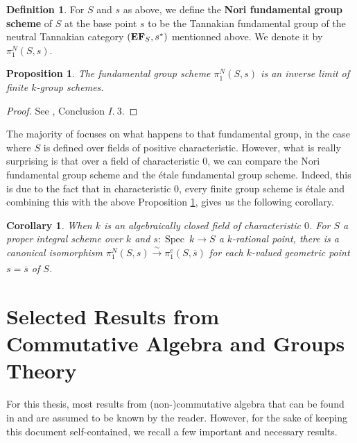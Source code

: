 \documentclass{article}
\theoremstyle{plain}
\newtheorem{proposition}[theorem]{Proposition}
\newtheorem{corollary}[theorem]{Corollary}
\theoremstyle{definition}
\newtheorem{definition}[theorem]{Definition}
\DeclareMathOperator{\Spec}{Spec}
\DeclareMathOperator{\EF}{\bf{EF}}
\begin{document}
\begin{definition}
    For $S$ and $s$ as above, we define the \textbf{Nori fundamental group scheme} of $S$ at the base point $s$ to be the Tannakian fundamental group of the neutral Tannakian category $(\EF_S, s^*)$ mentionned above.
    We denote it by $\pi_1^N(S,s)$.
\end{definition}

\begin{proposition}
\label{Nori_invers_limit}
    The fundamental group scheme $\pi_1^N(S,s)$ is an inverse limit of finite $k$-group schemes.
\end{proposition}
\begin{proof}
    See \cite{Nori}, Conclusion $I.\:3.$
\end{proof}

\noindent The majority of \cite{Nori} focuses on what happens to that fundamental group, in the case where $S$ is defined over fields of positive characteristic.
However, what is really surprising is that over a field of characteristic $0$, we can compare the Nori fundamental group scheme and the \'etale fundamental group scheme.
Indeed, this is due to the fact that in characteristic $0$, every finite group scheme is \'etale and combining this with the above Proposition \ref{Nori_invers_limit}, gives us the following corollary.

\begin{corollary}
    When $k$ is an algebraically closed field of characteristic $0$.
    For $S$ a proper integral scheme over $k$ and $s:\Spec\:k \rightarrow S$ a $k$-rational point, there is a canonical isomorphism
    $\pi_1^N(S,s) \xrightarrow[]{\sim} \pi_1^e(S,\overline{s})$ for each $k$-valued geometric point $s = \overline{s}$ of $S$.
\end{corollary}








\appendix


\newpage
\section{Selected Results from Commutative Algebra and Groups Theory}

For this thesis, most results from (non-)commutative algebra that can be found in \cite{Lang_algebra} and \cite{Eisenbud} are assumed to be known by the reader. 
However, for the sake of keeping this document self-contained, we recall a few important and necessary results.
\end{document}
